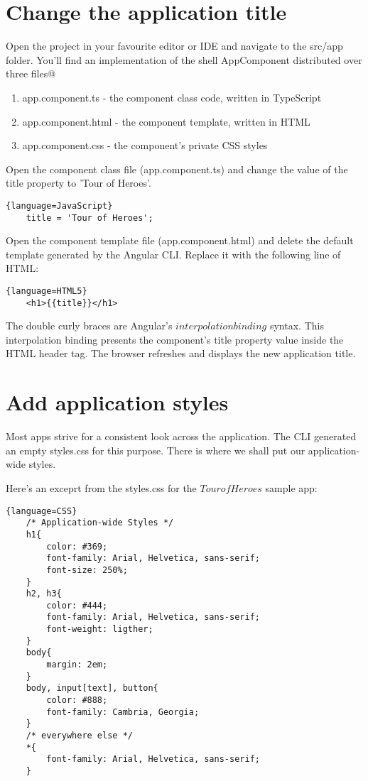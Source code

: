 \section{Change the application title}
Open the project in your favourite editor or IDE and navigate to the src/app folder. You'll find an implementation of the shell AppComponent distributed over three files@
\begin{enumerate}
    \item app.component.ts - the component class code, written in TypeScript
    \item app.component.html - the component template, written in HTML
    \item app.component.css - the component's private CSS styles
\end{enumerate}

Open the component class file (app.component.ts) and change the value of the title property to 'Tour of Heroes'.

\begin{lstlisting}{language=JavaScript}
    title = 'Tour of Heroes';
\end{lstlisting}

Open the component template file (app.component.html) and delete the default template generated by the Angular CLI. Replace it with the following line of HTML:

\begin{lstlisting}{language=HTML5}
    <h1>{{title}}</h1>
\end{lstlisting}

The double curly braces are Angular's $interpolation binding$ syntax. This interpolation binding presents the component's title property value inside the HTML header tag. The browser refreshes and displays the new application title.

\section{Add application styles}
Most apps strive for a consistent look across the application. The CLI generated an empty styles.css for this purpose. There is where we shall put our application-wide styles.

Here's an exceprt from the styles.css for the $Tour of Heroes$ sample app:


\begin{lstlisting}{language=CSS}
    /* Application-wide Styles */
    h1{
        color: #369;
        font-family: Arial, Helvetica, sans-serif;
        font-size: 250%;
    }
    h2, h3{
        color: #444;
        font-family: Arial, Helvetica, sans-serif;
        font-weight: ligther;
    }
    body{
        margin: 2em;
    }
    body, input[text], button{
        color: #888;
        font-family: Cambria, Georgia;
    }
    /* everywhere else */
    *{
        font-family: Arial, Helvetica, sans-serif;
    }
\end{lstlisting}

